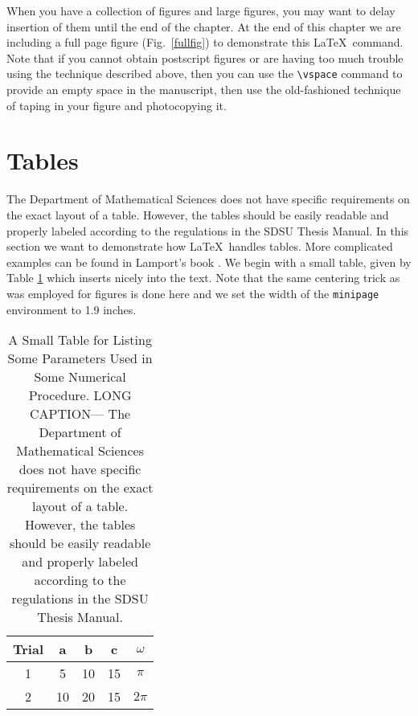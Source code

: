 

When you have a collection of figures and large figures, you may want
to delay insertion of them until the end of the chapter. At the end of
this chapter we are including a full page figure (Fig.~\ref{fullfig})
to demonstrate this \LaTeX\ command. Note that if you cannot obtain
postscript figures or are having too much trouble using the technique
described above, then you can use the \verb+\vspace+ command to
provide an empty space in the manuscript, then use the old-fashioned
technique of taping in your figure and photocopying it.

% 
% 


\section{Tables}

The Department of Mathematical Sciences does not have specific
requirements on the exact layout of a table. However, the tables
should be easily readable and properly labeled according to the
regulations in the SDSU Thesis Manual. In this section we want to
demonstrate how \LaTeX\ handles tables. More complicated examples can
be found in Lamport's book \cite{LAM,LAM2}. We begin with a small table,
given by Table \ref{tab1} which inserts nicely into the text.  Note
that the same centering trick as was employed for figures is done here
and we set the width of the \texttt{minipage} environment to 1.9
inches.
% 

\begin{table}[hbt]
  \centering
  \begin{minipage}{1.9in}
    \caption{A Small Table for Listing Some Parameters Used in Some
      Numerical Procedure\label{tab1}. LONG CAPTION--- The Department
      of Mathematical Sciences does not have specific requirements on
      the exact layout of a table. However, the tables should be
      easily readable and properly labeled according to the
      regulations in the SDSU Thesis Manual.}
    \begin{tabular}{|c||c|c|c|c||}    \hline
      Trial &	a  &  b & c & $\omega$ \\ \hline \hline
      1 & 5 & 10  & 15 & $\pi$ \\ \hline
      2 & 10 & 20  & 15 & $2\pi$ \\ \hline
    \end{tabular}
  \end{minipage}
\end{table}
% 

